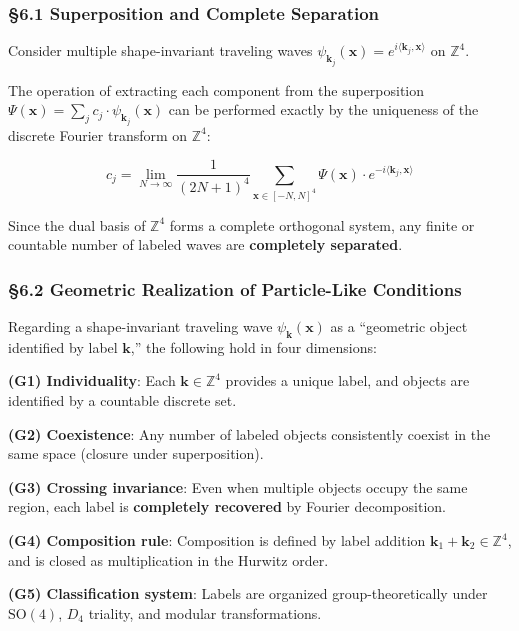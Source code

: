 \documentclass[
  a4paper,11pt]{article}
\theoremstyle{definition}
\theoremstyle{remark}
\begin{document}
\subsubsection{§6.1 Superposition and Complete
Separation}\label{superposition-and-complete-separation}

Consider multiple shape-invariant traveling waves
\(\psi_{\mathbf{k}_j}(\mathbf{x}) = e^{i\langle \mathbf{k}_j, \mathbf{x} \rangle}\)
on \(\mathbb{Z}^4\).

The operation of extracting each component from the superposition
\(\Psi(\mathbf{x}) = \sum_j c_j \cdot \psi_{\mathbf{k}_j}(\mathbf{x})\)
can be performed exactly by the uniqueness of the discrete Fourier
transform on \(\mathbb{Z}^4\):

\[c_j = \lim_{N \to \infty} \frac{1}{(2N+1)^4} \sum_{\mathbf{x} \in [-N,N]^4} \Psi(\mathbf{x}) \cdot e^{-i\langle \mathbf{k}_j, \mathbf{x} \rangle}\]

Since the dual basis of \(\mathbb{Z}^4\) forms a complete orthogonal
system, any finite or countable number of labeled waves are
\textbf{completely separated}.

\subsubsection{§6.2 Geometric Realization of Particle-Like
Conditions}\label{geometric-realization-of-particle-like-conditions}

Regarding a shape-invariant traveling wave
\(\psi_{\mathbf{k}}(\mathbf{x})\) as a ``geometric object identified by
label \(\mathbf{k}\),'' the following hold in four dimensions:

\textbf{(G1) Individuality}: Each \(\mathbf{k} \in \mathbb{Z}^4\)
provides a unique label, and objects are identified by a countable
discrete set.

\textbf{(G2) Coexistence}: Any number of labeled objects consistently
coexist in the same space (closure under superposition).

\textbf{(G3) Crossing invariance}: Even when multiple objects occupy the
same region, each label is \textbf{completely recovered} by Fourier
decomposition.

\textbf{(G4) Composition rule}: Composition is defined by label addition
\(\mathbf{k}_1 + \mathbf{k}_2 \in \mathbb{Z}^4\), and is closed as
multiplication in the Hurwitz order.

\textbf{(G5) Classification system}: Labels are organized
group-theoretically under \(\mathrm{SO}(4)\), \(D_4\) triality, and
modular transformations.
\end{document}
